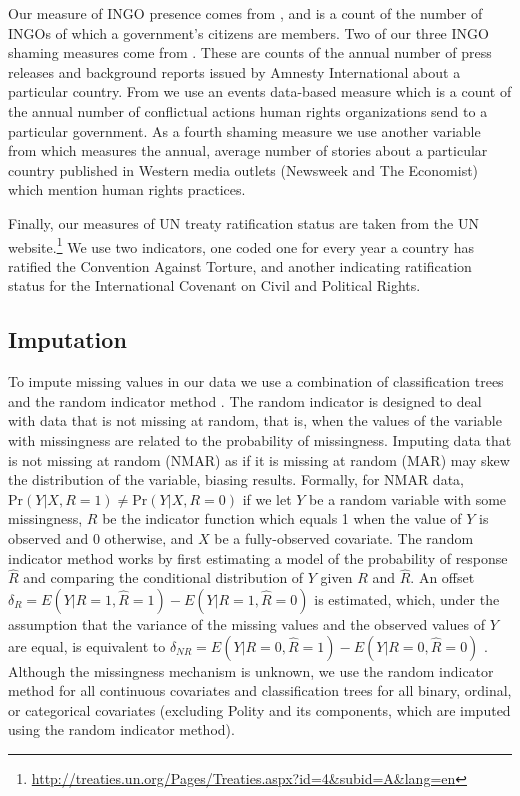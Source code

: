 \documentclass[12pt]{article}
\begin{document}
Our measure of INGO presence comes from \citet{HafnerBurtonTsutsui2005}, and is a count of the number of INGOs of which a government's citizens are members. Two of our three INGO shaming measures come from \citet{RonRamosRodgers2005}. These are counts of the annual number of press releases and background reports issued by Amnesty International about a particular country. From \citet{MurdieDavis2012} we use an events data-based measure which is a count of the annual number of conflictual actions human rights organizations send to a particular government. As a fourth shaming measure we use another variable from \citet{RonRamosRodgers2005} which measures the annual, average number of stories about a particular country published in Western media outlets (Newsweek and The Economist) which mention human rights practices. 

Finally, our measures of UN treaty ratification status are taken from the UN website.\footnote{\url{http://treaties.un.org/Pages/Treaties.aspx?id=4&subid=A&lang=en}} We use two indicators, one coded one for every year a country has ratified the Convention Against Torture, and another indicating ratification status for the International Covenant on Civil and Political Rights. 

\subsection{Imputation}

To impute missing values in our data we use a combination of classification trees and the random indicator method \citep{buuren2011mice,jolani2012}. The random indicator is designed to deal with data that is not missing at random, that is, when the values of the variable with missingness are related to the probability of missingness. Imputing data that is not missing at random (NMAR) as if it is missing at random (MAR) may skew the distribution of the variable, biasing results. Formally, for NMAR data, $\text{Pr}(Y|X, R=1) \neq \text{Pr}(Y|X, R=0)$ if we let $Y$ be a random variable with some missingness, $R$ be the indicator function which equals 1 when the value of $Y$ is observed and 0 otherwise, and $X$ be a fully-observed covariate. The random indicator method works by first estimating a model of the probability of response $\hat{R}$ and comparing the conditional distribution of $Y$ given $R$ and $\hat{R}$. An offset $\delta_R = E(Y|R=1,\hat{R}=1) - E(Y|R=1,\hat{R}=0)$ is estimated, which, under the assumption that the variance of the missing values and the observed values of $Y$ are equal, is equivalent to $\delta_{NR} = E(Y|R=0,\hat{R}=1) - E(Y|R=0,\hat{R}=0)$ \citep{jolani2012}. Although the missingness mechanism is unknown, we use the random indicator method for all continuous covariates and classification trees for all binary, ordinal, or categorical covariates (excluding Polity and its components, which are imputed using the random indicator method). %
\end{document}
